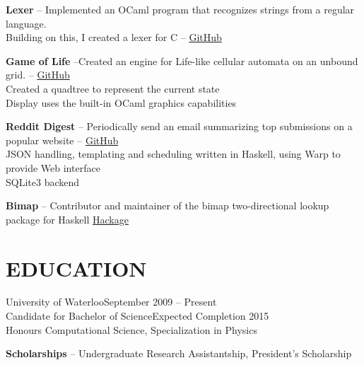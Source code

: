 \documentclass{res}
\begin{document}
\begin{resume}
    {\bf Lexer} -- Implemented an OCaml program that recognizes strings from a regular language.\\
    \hspace*{10mm}  Building on this, I created a lexer for C --
    \href{https://www.github.com/joelwilliamson/ndfa}{GitHub}
    \vspace{-3mm}

    {\bf Game of Life} --Created an engine for Life-like cellular automata on an unbound grid. --
    \href{https://www.github.com/joelwilliamson/life}{GitHub} \\
    \hspace*{10mm}  Created a quadtree to represent the current state \\
    \hspace*{10mm}  Display uses the built-in OCaml graphics capabilities
    \vspace{-3mm}

    {\bf Reddit Digest} -- Periodically send an email summarizing top submissions on a popular website --
    \href{https://github.com/joelwilliamson/reddit-digest}{GitHub}\\
    \hspace*{10mm}  JSON handling, templating and scheduling written in Haskell, using Warp to provide Web interface \\
    \hspace*{10mm}  SQLite3 backend
    \vspace{-3mm}

    {\bf Bimap} -- Contributor and maintainer of the bimap two-directional lookup package for Haskell
    \href{http://hackage.haskell.org/package/bimap-0.3.0}{Hackage}
    

   
\section{EDUCATION}          
  \vspace{3mm}
    University of Waterloo\hfill September 2009 -- Present\\
    Candidate for Bachelor of Science\hfill Expected Completion 2015\\
    Honours Computational Science, Specialization in Physics
    \vspace{-3mm}
    
    {\bf Scholarships} -- Undergraduate Research Assistantship, President's Scholarship
    \vspace{-3mm}
    

\end{resume}
\end{document}
